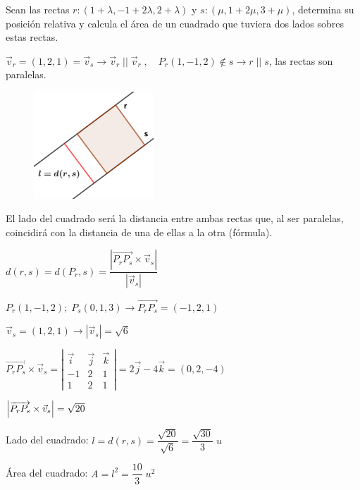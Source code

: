 \begin{ejre}
	Sean las rectas $r: (1+\lambda,-1+2\lambda,2+\lambda)$ y $s: (\mu,1+2\mu,3+\mu)$, determina su posición relativa y calcula el área de un cuadrado que tuviera dos lados sobres estas rectas.
\end{ejre}
\begin{proofw}\renewcommand{\qedsymbol}{$\diamond$}	
\noindent $\vec v_r=(1,2,1)=\vec v_s \to \vec v_r\;||\;\vec v_r\;, \quad P_r(1,-1,2)\notin s \to r\;||\;s$, las rectas son paralelas.

\begin{multicols}{2}
	\begin{figure}[H]
		\centering
		\includegraphics[width=0.4\textwidth]{imagenes/imagenes11/T11IM29.png}
	\end{figure}
\noindent El lado del cuadrado será la distancia entre ambas rectas que, al ser paralelas, coincidirá con la distancia de una de ellas a la otra (fórmula).

\noindent $d(r,s)=d(P_r,s)=\dfrac {|\overrightarrow{P_rP_s} \times \vec v_s|}{|\vec v_s|}$
\end{multicols}

\noindent $P_r(1,-1,2);\; P_s(0,1,3) \to \overrightarrow{P_rP_s}=(-1,2,1)$

\noindent $\vec v_s=(1,2,1) \to |\vec v_s|=\sqrt{6}$

\noindent $\overrightarrow{P_rP_s} \times \vec v_s=\left| \begin{matrix} \vec i&\vec j&\vec k\\-1&2&1\\1&2&1 \end{matrix} \right|=2\vec j - 4 \vec k =(0,2,-4)$

\noindent $\abs{\overrightarrow{P_rP_s} \times \vec v_s}=\sqrt{20}$

\noindent Lado del cuadrado: $l=d(r,s)=\dfrac {\sqrt{20}}{\sqrt{6}}=\dfrac{\sqrt{30}}{3}\; u$

\noindent Área del cuadrado: $A=l^2=\dfrac {10}3 \; u^2$
\end{proofw}


